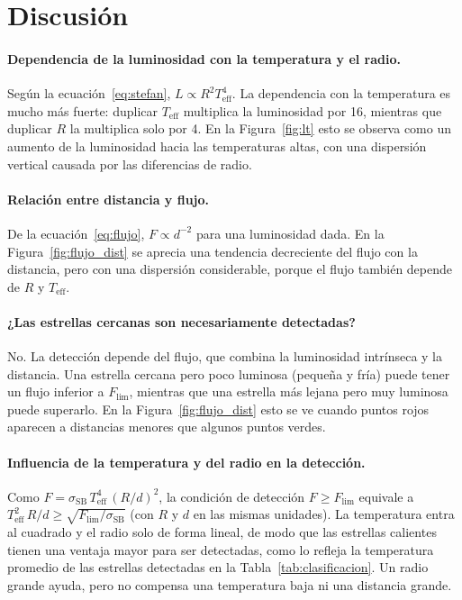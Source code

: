 \documentclass[11pt,a4paper]{article}
\begin{document}
\section{Discusión}
\paragraph{Dependencia de la luminosidad con la temperatura y el radio.}
Según la ecuación~\eqref{eq:stefan}, $L \propto R^{2}T_{\mathrm{eff}}^{4}$. La dependencia
con la temperatura es mucho más fuerte: duplicar $T_{\mathrm{eff}}$ multiplica la luminosidad por 16, mientras que duplicar $R$ la multiplica solo por 4. En la Figura~\ref{fig:lt} esto se observa como un aumento de la luminosidad hacia las temperaturas altas, con una dispersión
vertical causada por las diferencias de radio.

\paragraph{Relación entre distancia y flujo.} 
De la ecuación~\eqref{eq:flujo}, $F \propto d^{-2}$ para una luminosidad dada. En la Figura~\ref{fig:flujo_dist} se aprecia una tendencia decreciente del flujo con la distancia, pero con una dispersión considerable, porque el flujo también depende de $R$ y $T_{\mathrm{eff}}$.

\paragraph{¿Las estrellas cercanas son necesariamente detectadas?}
No. La detección depende del flujo, que combina la luminosidad intrínseca y la distancia. Una estrella cercana pero poco luminosa (pequeña y fría) puede tener un flujo inferior a
$F_{\mathrm{lim}}$, mientras que una estrella más lejana pero muy luminosa puede superarlo. En la Figura~\ref{fig:flujo_dist} esto se ve cuando puntos rojos aparecen a distancias menores que algunos puntos verdes.

\paragraph{Influencia de la temperatura y del radio en la detección.}
Como $F = \sigma_{\mathrm{SB}}\,T_{\mathrm{eff}}^{4}\,(R/d)^{2}$, la condición de detección
$F \geq F_{\mathrm{lim}}$ equivale a $T_{\mathrm{eff}}^{2}\,R/d \geq \sqrt{F_{\mathrm{lim}}/\sigma_{\mathrm{SB}}}$ (con $R$ y $d$ en las mismas unidades). La temperatura entra al cuadrado y el radio solo de forma lineal, de modo que las estrellas calientes tienen una ventaja mayor para ser detectadas, como lo refleja la temperatura promedio de las estrellas detectadas en la Tabla~\ref{tab:clasificacion}. Un radio grande ayuda, pero no compensa una temperatura baja ni una distancia grande.
\end{document}
